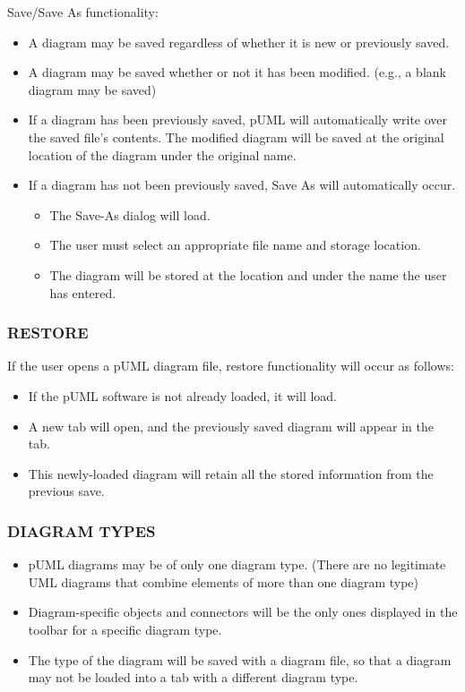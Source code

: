 \documentclass[twoside,letterpaper]{article}
\begin{document}
\newline Save/Save As functionality:
\newline
\begin{itemize}
\item A diagram may be saved regardless of whether it is new or previously saved.
\item A diagram may be saved whether or not it has been modified. (e.g., a blank diagram may be saved)
\item If a diagram has been previously saved, pUML will automatically write over the saved file's contents. The modified diagram will be saved at the original location of the diagram under the original name.
\item If a diagram has not been previously saved, Save As will automatically occur.
\begin{itemize}
\item The Save-As dialog will load.
\item The user must select an appropriate file name and storage location. 
\item The diagram will be stored at the location and under the name the user has entered.
\end{itemize}
\end{itemize}


\bigskip


\subsubsection[RESTORE]{\bfseries RESTORE}

If the user opens a pUML diagram file, restore functionality will occur as follows:
\begin{itemize}
\item If the pUML software is not already loaded, it will load.
\item A new tab will open, and the previously saved diagram will appear in the tab.
\item This newly-loaded diagram will retain all the stored information from the previous save.
\end{itemize}


\bigskip

\subsubsection[DIAGRAM TYPES]{\bfseries DIAGRAM TYPES}

\begin{itemize}
\item pUML diagrams may be of only one diagram type. (There are no legitimate UML diagrams that combine elements of more than one diagram type)
\item Diagram-specific objects and connectors will be the only ones displayed in the toolbar for a specific diagram type.
\item The type of the diagram will be saved with a diagram file, so that a diagram may not be loaded into a tab with a different diagram type.
\end{itemize}
\end{document}
